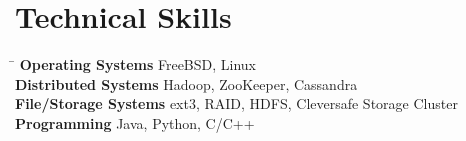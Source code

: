\documentclass[10pt]{article} %
\begin{document}

\section{Technical Skills}

\begin{tabbing}
\hspace{4cm} \= \kill
\textbf{Operating Systems} \> FreeBSD, Linux \\
\textbf{Distributed Systems} \> Hadoop, ZooKeeper, Cassandra \\
\textbf{File/Storage Systems} \> ext3, RAID, HDFS, Cleversafe Storage Cluster\\
\textbf{Programming} \> Java, Python, C/C++
\end{tabbing}
\end{document}
